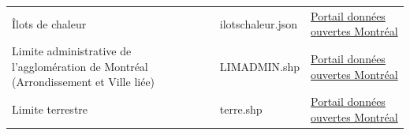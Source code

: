 \documentclass[]{book}
\theoremstyle{definition}
\theoremstyle{definition}
\theoremstyle{definition}
\theoremstyle{remark}
\begin{document}
\begin{longtable}[]{@{}lll@{}}
\begin{minipage}[t]{0.08\columnwidth}\raggedright\strut
Îlots de chaleur\strut
\end{minipage} & \begin{minipage}[t]{0.15\columnwidth}\raggedright\strut
ilotschaleur.json\strut
\end{minipage} & \begin{minipage}[t]{0.10\columnwidth}\raggedright\strut
\href{http://donnees.ville.montreal.qc.ca/dataset/schema-environnement-milieux-naturels/resource/8cd8d34a-cfdd-4acf-a363-d4adaeff18c0}{Portail
données ouvertes Montréal}\strut
\end{minipage}\tabularnewline
\begin{minipage}[t]{0.08\columnwidth}\raggedright\strut
Limite administrative de l'agglomération de Montréal (Arrondissement et
Ville liée)\strut
\end{minipage} & \begin{minipage}[t]{0.15\columnwidth}\raggedright\strut
LIMADMIN.shp\strut
\end{minipage} & \begin{minipage}[t]{0.10\columnwidth}\raggedright\strut
\href{http://donnees.ville.montreal.qc.ca/dataset/polygones-arrondissements}{Portail
données ouvertes Montréal}\strut
\end{minipage}\tabularnewline
\begin{minipage}[t]{0.08\columnwidth}\raggedright\strut
Limite terrestre\strut
\end{minipage} & \begin{minipage}[t]{0.15\columnwidth}\raggedright\strut
terre.shp\strut
\end{minipage} & \begin{minipage}[t]{0.10\columnwidth}\raggedright\strut
\href{http://donnees.ville.montreal.qc.ca/dataset/limites-terrestres/resource/674c2a18-e013-42ca-bfa6-3bb7358e820d}{Portail
données ouvertes Montréal}\strut
\end{minipage}\tabularnewline
\bottomrule
\end{longtable}


\end{document}
